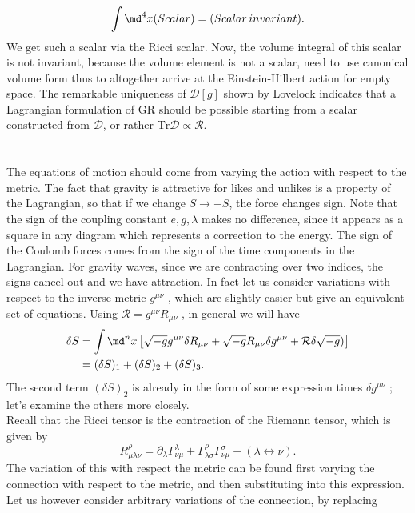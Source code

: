 \begin{equation}
\int \md^4 x (Scalar) = (Scalar \, invariant).
\end{equation}
We get such a scalar via the Ricci scalar. Now, the volume integral of this scalar is not invariant, because the volume element is not a scalar, need to use canonical volume form thus to altogether arrive at the Einstein-Hilbert action for empty space. The remarkable uniqueness of $\mathcal{D}[g]$ shown by Lovelock indicates that a Lagrangian formulation of GR should be possible starting from a scalar constructed from $\mathcal{D}$, or rather $\mathrm{Tr}\mathcal{D} \propto \mathcal{R}$.\\\\
\\
The equations of motion should come from varying the action with respect to the metric. The fact that gravity is attractive for likes and unlikes is a property of the Lagrangian, so that if we change $S\rightarrow -S$, the force changes sign. Note that the sign of the coupling constant $e,g,\lambda$ makes no difference, since it appears as a square in any diagram which represents a correction to the energy. The sign of the Coulomb forces comes from the sign of the time components in the Lagrangian. For gravity waves, since we are contracting over two indices, the signs cancel out and we have attraction. In fact let us consider variations with respect to the inverse metric $g^{\mu \nu}$ , which are slightly
easier but give an equivalent set of equations. Using $\mathcal{R} = g^{μν} R_{μν}$ , in general we will have
\begin{align}
	\delta S &=  \int \md^n x \left[\sqrt{-g} g^{\mu \nu} \delta R_{\mu \nu} + \sqrt{-g} R_{\mu \nu} \delta g^{\mu \nu} + \mathcal{R} \delta \sqrt{-g})\right] \\
	&= (\delta S)_1 + (\delta S)_2 + (\delta S)_3 \nonumber.
\end{align}
The second term $(δS)_2$ is already in the form of some expression times $δg^{μν}$ ; let’s examine
the others more closely.\\
Recall that the Ricci tensor is the contraction of the Riemann tensor, which is given by
\begin{equation}
	R^\rho_{\mu \lambda \nu} = \partial_\lambda \Gamma^\lambda_{\nu \mu} + \Gamma^\rho_{\lambda \sigma}\Gamma^\sigma_{\nu\mu} - (\lambda \leftrightarrow \nu). 
\end{equation}
The variation of this with respect the metric can be found first varying the connection with
respect to the metric, and then substituting into this expression. Let us however consider arbitrary variations of the connection, by replacing
